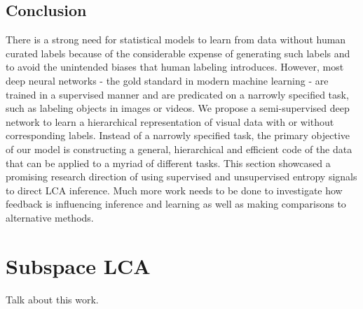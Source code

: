 \subsection{Conclusion}
There is a strong need for statistical models to learn from data without human curated labels because of the considerable expense of generating such labels and to avoid the unintended biases that human labeling introduces. However, most deep neural networks - the gold standard in modern machine learning - are trained in a supervised manner and are predicated on a narrowly specified task, such as labeling objects in images or videos. We propose a semi-supervised deep network to learn a hierarchical representation of visual data with or without corresponding labels. Instead of a narrowly specified task, the primary objective of our model is constructing a general, hierarchical and efficient code of the data that can be applied to a myriad of different tasks. This section showcased a promising research direction of using supervised and unsupervised entropy signals to direct LCA inference. Much more work needs to be done to investigate how feedback is influencing inference and learning as well as making comparisons to alternative methods.


\section{Subspace LCA}
Talk about this work.